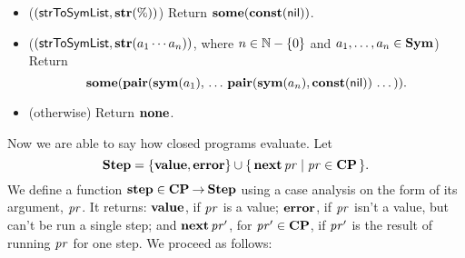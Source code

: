 \begin{itemize}
\item ($(\mathsf{strToSymList}, \mathbf{str}(\%))$)
  Return $\mathbf{some}(\mathbf{const}(\mathsf{nil}))$.

\item ($(\mathsf{strToSymList}, \mathbf{str}(a_1\cdots a_n))$,
  where $n\in\mathbb{N}-\{0\}$ and $a_1,\ldots,a_n\in\mathbf{Sym}$)
  Return
  \begin{displaymath}
    \mathbf{some}(\mathbf{pair}(\mathbf{sym}(a_1),\, \ldots\, \mathbf{pair}(\mathbf{sym}(a_n),
    \mathbf{const}(\mathsf{nil}))\,\ldots\,)) .
  \end{displaymath}

\item (otherwise) Return $\mathbf{none}$.
\end{itemize}

Now we are able to say how closed programs evaluate.  Let
\begin{displaymath}
  \mathbf{Step} = \{\mathbf{value}, \mathbf{error}\} \cup
  \{ \, \mathbf{next}\,\mathit{pr} \mid \mathit{pr}\in\mathbf{CP} \, \} .
\end{displaymath}
We define a function $\mathbf{step}\in\mathbf{CP}\mathbin{\to}\mathbf{Step}$ using a case analysis
on the form of its argument, $\mathit{pr}$.  It returns: $\mathbf{value}$, if
$\mathit{pr}$ is a value; $\mathbf{error}$, if $\mathit{pr}$ isn't a value, but can't be
run a single step; and $\mathbf{next}\,\mathit{pr}'$, for $\mathit{pr}'\in\mathbf{CP}$, if
$\mathit{pr}'$ is the result of running $\mathit{pr}$ for one step.
We proceed as follows:
